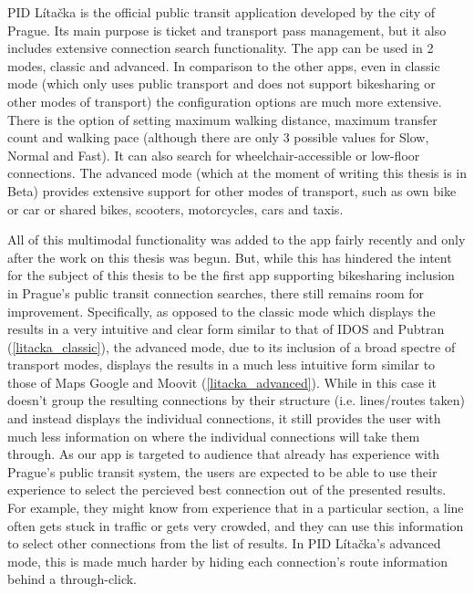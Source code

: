 PID Lítačka is the official public transit application developed by the city of Prague. Its main purpose is ticket and transport pass management, but it also includes extensive connection search functionality. The app can be used in 2 modes, classic and advanced. In comparison to the other apps, even in classic mode (which only uses public transport and does not support bikesharing or other modes of transport) the configuration options are much more extensive. There is the option of setting maximum walking distance, maximum transfer count and walking pace (although there are only 3 possible values for Slow, Normal and Fast). It can also search for wheelchair-accessible or low-floor connections. The advanced mode (which at the moment of writing this thesis is in Beta) provides extensive support for other modes of transport, such as own bike or car or shared bikes, scooters, motorcycles, cars and taxis. 

All of this multimodal functionality was added to the app fairly recently and only after the work on this thesis was begun. But, while this has hindered the intent for the subject of this thesis to be the first app supporting bikesharing inclusion in Prague's public transit connection searches, there still remains room for improvement. Specifically, as opposed to the classic mode which displays the results in a very intuitive and clear form similar to that of IDOS and Pubtran (\cref{litacka_classic}), the advanced mode, due to its inclusion of a broad spectre of transport modes, displays the results in a much less intuitive form similar to those of Maps Google and Moovit (\cref{litacka_advanced}). While in this case it doesn't group the resulting connections by their structure (i.e. lines/routes taken) and instead displays the individual connections, it still provides the user with much less information on where the individual connections will take them through. As our app is targeted to audience that already has experience with Prague's public transit system, the users are expected to be able to use their experience to select the percieved best connection out of the presented results. For example, they might know from experience that in a particular section, a line often gets stuck in traffic or gets very crowded, and they can use this information to select other connections from the list of results. In PID Lítačka's advanced mode, this is made much harder by hiding each connection's route information behind a through-click. 


